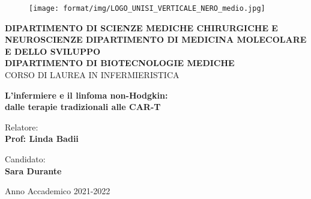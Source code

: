\begin{titlepage}
\begin{figure}[!htb]
    \centering
    \texttt{[image: format/img/LOGO\_UNISI\_VERTICALE\_NERO\_medio.jpg]}
\end{figure}

\begin{center}
    \large{\bf DIPARTIMENTO DI SCIENZE MEDICHE CHIRURGICHE E NEUROSCIENZE
    DIPARTIMENTO DI MEDICINA MOLECOLARE E DELLO SVILUPPO\\
    DIPARTIMENTO DI BIOTECNOLOGIE MEDICHE}
    \vspace{0.5mm}
    \\ \large{CORSO DI LAUREA IN INFERMIERISTICA}
\end{center}

\vspace{15mm}
\begin{center}
    {\LARGE{\bf L'infermiere e il linfoma non-Hodgkin:\\ \vspace{5mm} dalle terapie tradizionali alle CAR-T }}
    
    
\end{center}
\vspace{30mm}

\begin{minipage}[t]{0.47\textwidth}
	{\large{Relatore:}{\normalsize\vspace{3mm}
    \bf\\ \large{Prof: Linda Badii} \normalsize\vspace{3mm}\bf}}
\end{minipage}
\hfill
\begin{minipage}[t]{0.47\textwidth}\raggedleft
	{\large{Candidato:}{\normalsize\vspace{3mm} \bf\\ \large{Sara Durante}}}
\end{minipage}

\vspace{10mm}

\begin{center}
    {\large{Anno Accademico 2021-2022}}
\end{center}

\vspace{30mm}

\end{titlepage}
